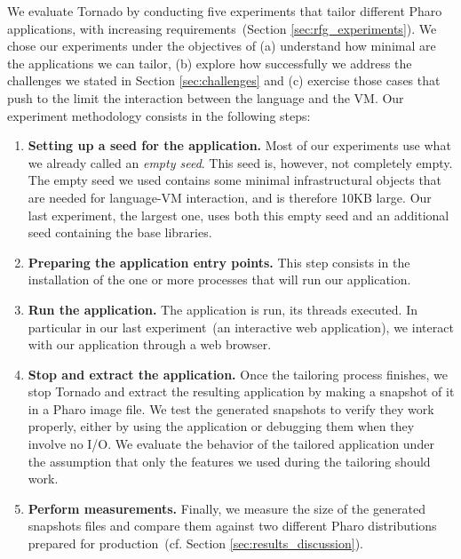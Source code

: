 %
We evaluate Tornado by conducting five experiments that tailor different Pharo applications, with increasing requirements~(Section \ref{sec:rfg_experiments}). We chose our experiments under the objectives of (a) understand how minimal are the applications we can tailor, (b) explore how successfully we address the challenges we stated in Section \ref{sec:challenges} and (c) exercise those cases that push to the limit the interaction between the language and the VM. Our experiment methodology consists in the following steps:

\begin{enumerate}
\item \textbf{Setting up a seed for the application.} Most of our experiments use what we already called an \emph{empty seed}. This seed is, however, not completely empty. The empty seed we used contains some minimal infrastructural objects that are needed for language-VM interaction, and is therefore 10KB large. Our last experiment, the largest one, uses both this empty seed and an additional seed containing the base libraries. 
\item \textbf{Preparing the application entry points.} This step consists in the installation of the one or more processes that will run our application.
\item \textbf{Run the application.} The application is run, its threads executed. In particular in our last experiment~(an interactive web application), we interact with our application through a web browser. 
\item \textbf{Stop and extract the application.} Once the tailoring process finishes, we stop Tornado and extract the resulting application by making a snapshot of it in a Pharo image file. We test the generated snapshots to verify they work properly, either by using the application or debugging them when they involve no I/O. We evaluate the behavior of the tailored application under the assumption that only the features we used during the tailoring should work.
\item \textbf{Perform measurements.} Finally, we measure the size of the generated snapshots files and compare them against two different Pharo distributions prepared for production~(cf. Section \ref{sec:results_discussion}).
\end{enumerate}

